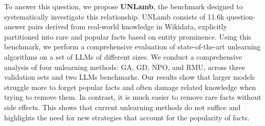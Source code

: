 To answer this question, we propose \textbf{UNLamb}, the benchmark designed to systematically investigate this relationship. UNLamb consists of 11.6k question-answer pairs derived from real-world knowledge in Wikidata, explicitly partitioned into rare and popular facts based on entity prominence. Using this benchmark, we perform a comprehensive evaluation of state-of-the-art unlearning algorithms on a set of LLMs of different sizes.
We conduct a comprehensive analysis of four unlearning methods: GA, GD, NPO, and RMU, across three validation sets and two LLMs benchmarks. Our results show that larger models struggle more to forget popular facts and often damage related knowledge when trying to remove them. In contrast, it is much easier to remove rare facts without side effects. This shows that current unlearning methods do not suffice and highlights the need for new strategies that account for the popularity of facts. 
